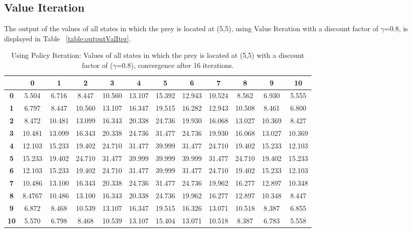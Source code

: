 \documentclass[11pt]{article}
\begin{document}
\subsection{Value Iteration}
The output of the values of all states in which the prey is located at (5,5), using Value Iteration with a discount factor of $\gamma$=0.8, is displayed in Table ~\ref{table:outputValIter}.
\begin{center}
\begin{table}[ht]
{\small
\hfill{}
\begin{tabular}{c|c|c|c|c|c|c|c|c|c|c|c}
\textbf{} & \textbf{0} & \textbf{1} & \textbf{2} & \textbf{3} & \textbf{4} & \textbf{5} & \textbf{6} & \textbf{7} & \textbf{8} & \textbf{9} & \textbf{10}\\
	\hline
\textbf{0} & 5.504 & 6.716 &
8.447 & 10.560 & 13.107 & 15.392 & 12.943 & 10.524 & 8.562 & 6.930 & 5.555\\
\textbf{1} & 6.797 & 8.447 & 10.560 & 13.107 & 16.347 & 19.515 & 16.282 & 12.943 & 10.508 & 8.461 & 6.800\\
\textbf{2} & 8.472 & 10.481 & 13.099 & 16.343 & 20.338 & 24.736 & 19.930 & 16.068 & 13.027 & 10.369 & 8.427\\
\textbf{3} & 10.481 & 13.099 & 16.343 & 20.338 & 24.736 & 31.477 & 24.736 & 19.930 & 16.068 & 13.027 & 10.369\\
\textbf{4} & 12.103 & 15.233 & 19.402 & 24.710 & 31.477 & 39.999 & 31.477 & 24.710 & 19.402 & 15.233 & 12.103\\
\textbf{5} & 15.233 & 19.402 & 24.710 & 31.477 & 39.999 & 39.999 & 39.999 & 31.477 & 24.710 & 19.402 & 15.233\\
\textbf{6} & 12.103 & 15.233 & 19.402 & 24.710 & 31.477 & 39.999 & 31.477 & 24.710 & 19.402 & 15.233 & 12.103\\
\textbf{7} & 10.486 & 13.100 & 16.343 & 20.338 & 24.736 & 31.477 & 24.736 & 19.962 & 16.277 & 12.897 & 10.348\\
\textbf{8} & 8.4767 & 10.486 & 13.100 & 16.343 & 20.338 & 24.736 & 19.962 & 16.277 & 12.897 & 10.348 & 8.447\\
\textbf{9} & 6.872 & 8.468 & 10.539 & 13.107 & 16.347 & 19.515 & 16.326 & 13.071 & 10.518 & 8.387 & 6.855\\
\textbf{10} & 5.570 & 6.798 & 8.468 & 10.539 & 13.107 & 15.404 & 13.071 & 10.518 & 8.387 & 6.783 & 5.558\\
\end{tabular}}
\hfill{}
\caption{Using Policy Iteration: Values of all states in which the prey is located at (5,5) with a discount factor of ($\gamma$=0.8), convergence after 16 iterations.}
\label{table:outputPolIter}
\end{table}
\end{center}
\end{document}
